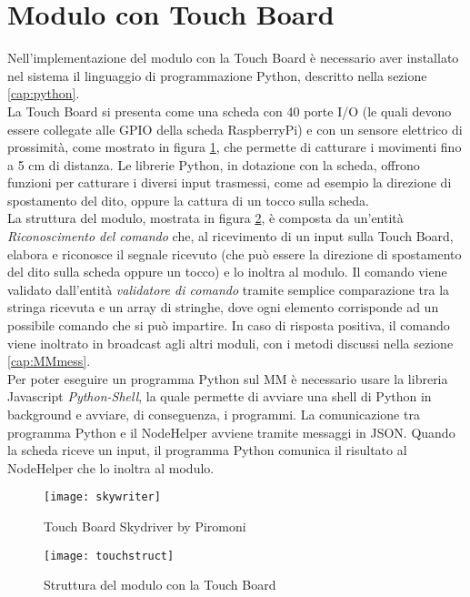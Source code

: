 \section{Modulo con Touch Board}\label{cap:touch}
Nell'implementazione del modulo con la Touch Board \`e necessario aver installato nel sistema
il linguaggio di programmazione Python, descritto nella sezione \ref{cap:python}.\\
La Touch Board si presenta come una scheda con 40 porte I/O (le quali devono essere collegate alle
GPIO della scheda RaspberryPi) e con un sensore elettrico di prossimit\`a, come mostrato in figura \ref{fig:TouchBoard}, che permette di catturare i movimenti fino a
5 cm di distanza.
Le librerie Python, in dotazione con la scheda, offrono funzioni per catturare i diversi input trasmessi, come ad esempio
la direzione di spostamento del dito, oppure la cattura di un tocco sulla scheda.\\
La struttura del modulo, mostrata in figura \ref{fig:structtouch}, \`e composta da un'entit\`a \emph{Riconoscimento del comando} che,
al ricevimento di un input
sulla Touch Board, elabora e riconosce il segnale ricevuto (che pu\`o essere la direzione di spostamento del dito sulla scheda oppure un tocco)
e lo inoltra al modulo.
Il comando viene validato dall'entità \emph{validatore di comando} tramite semplice comparazione tra la stringa ricevuta e un array di stringhe,
dove ogni elemento corrisponde
ad un possibile comando che si pu\`o impartire. In caso di risposta positiva, il comando viene inoltrato in broadcast agli altri moduli,
con i metodi discussi nella sezione \ref{cap:MMmess}.\\
Per poter eseguire un programma Python sul MM \`e necessario usare la libreria Javascript \emph{Python-Shell}, la quale
permette di avviare una shell di Python in background e avviare, di conseguenza, i programmi.
La comunicazione tra programma Python e il NodeHelper avviene tramite messaggi in JSON. Quando la scheda riceve un input,
il programma Python comunica il risultato al NodeHelper che lo inoltra al modulo.
\begin{figure}[H]
    \texttt{[image: skywriter]}
    \caption{Touch Board Skydriver by Piromoni}
    \label{fig:TouchBoard}
\end{figure}

\begin{figure}[H]
    \texttt{[image: touchstruct]}
    \caption{Struttura del modulo con la Touch Board}
    \label{fig:structtouch}
\end{figure}
